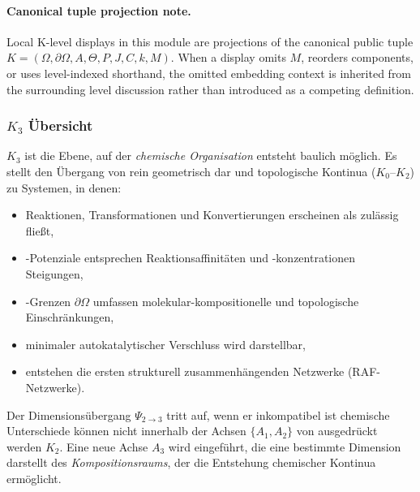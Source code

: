 



\paragraph{Canonical tuple projection note.}
Local K-level displays in this module are projections of the canonical public tuple \(K=(\Omega,\partial\Omega,A,\Theta,P,J,C,k,M)\). When a display omits \(M\), reorders components, or uses level-indexed shorthand, the omitted embedding context is inherited from the surrounding level discussion rather than introduced as a competing definition.

\subsubsection{\texorpdfstring{$K_3$}{K_3} Übersicht}
\label{sec:k3-overview}

$K_3$ ist die Ebene, auf der \emph{chemische Organisation} entsteht
baulich möglich. Es stellt den Übergang von rein geometrisch dar
und topologische Kontinua ($K_0$--$K_2$) zu Systemen, in denen:
\begin{itemize}
    \item Reaktionen, Transformationen und Konvertierungen erscheinen als zulässig
          fließt,
    \item-Potenziale entsprechen Reaktionsaffinitäten und -konzentrationen
          Steigungen,
    \item-Grenzen $\partial\Omega$ umfassen molekular-kompositionelle und
          topologische Einschränkungen,
    \item minimaler autokatalytischer Verschluss wird darstellbar,
    \item entstehen die ersten strukturell zusammenhängenden Netzwerke (RAF-Netzwerke).
\end{itemize}

Der Dimensionsübergang $\Psi_{2\to3}$ tritt auf, wenn er inkompatibel ist
chemische Unterschiede können nicht innerhalb der Achsen $\{A_1,A_2\}$ von ausgedrückt werden
$K_2$. Eine neue Achse $A_3$ wird eingeführt, die eine bestimmte Dimension darstellt
des \emph{Kompositionsraums}, der die Entstehung chemischer Kontinua ermöglicht.


